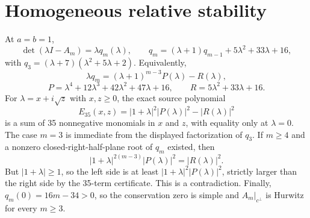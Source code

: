 \section*{Homogeneous relative stability}
At $a=b=1$,
\[
\det(\lambda I-A_m)=\lambda q_m(\lambda),
\qquad
q_m=(\lambda+1)q_{m-1}+5\lambda^2+33\lambda+16,
\]
with $q_3=(\lambda+7)(\lambda^2+5\lambda+2)$.  Equivalently,
\[
\lambda q_m=(\lambda+1)^{m-3}P(\lambda)-R(\lambda),
\]
\[
P=\lambda^4+12\lambda^3+42\lambda^2+47\lambda+16,
\qquad
R=5\lambda^2+33\lambda+16.
\]
For $\lambda=x+i\sqrt z$ with $x,z\ge0$, the exact source polynomial
\[
E_{35}(x,z)=|1+\lambda|^2|P(\lambda)|^2-|R(\lambda)|^2
\]
is a sum of 35 nonnegative monomials in $x$ and $z$, with equality only at
$\lambda=0$.  The case $m=3$ is immediate from the displayed factorization
of $q_3$.  If $m\ge4$ and a nonzero closed-right-half-plane root of $q_m$
existed, then
\[
 |1+\lambda|^{2(m-3)}|P(\lambda)|^2=|R(\lambda)|^2.
\]
But $|1+\lambda|\ge1$, so the left side is at least
$|1+\lambda|^2|P(\lambda)|^2$, strictly larger than the right side by the
35-term certificate.  This is a contradiction.  Finally,
$q_m(0)=16m-34>0$, so the conservation zero is simple and
$A_m|_{c^\perp}$ is Hurwitz for every $m\ge3$.
